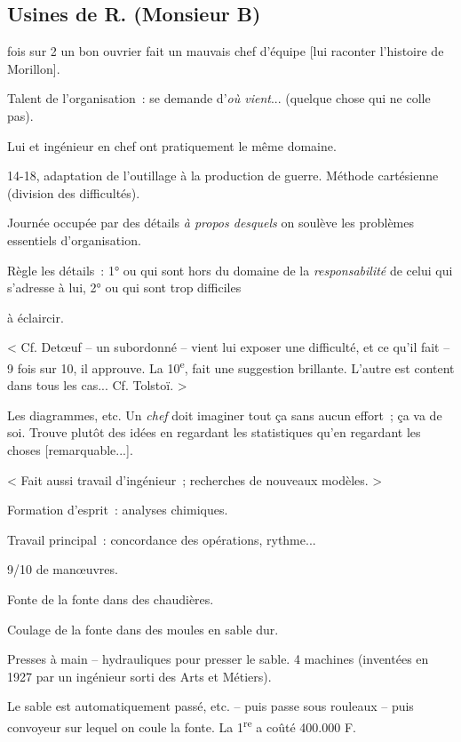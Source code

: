 \documentclass[french,twoside]{book} %
\begin{document}
\subsection[Usines de R. (Monsieur B)]{Usines de R. (Monsieur B)}
 fois sur 2 un bon ouvrier fait un mauvais chef d'équipe [lui raconter l'histoire de Morillon].\par
Talent de l'organisation : se demande d'{\itshape où vient}... (quelque chose qui ne colle pas).\par
Lui et ingénieur en chef ont pratiquement le même domaine.\par
14-18, adaptation de l'outillage à la production de guerre. Méthode cartésienne (division des difficultés).\par
Journée occupée par des détails {\itshape à propos desquels} on soulève les problèmes essentiels d'organisation.\par
Règle les détails : 1° ou qui sont hors du domaine de la {\itshape responsabilité} de celui qui s'adresse à lui, 2° ou qui sont trop difficiles\par
à éclaircir.\par
< Cf. Detœuf – un subordonné – vient lui exposer une difficulté, et ce qu'il fait – 9 fois sur 10, il approuve. La 10\textsuperscript{e}, fait une suggestion brillante. L'autre est content dans tous les cas... Cf. Tolstoï. >\par
Les diagrammes, etc. Un {\itshape chef} doit imaginer tout ça sans aucun effort ; ça va de soi. Trouve plutôt des idées en regardant les statistiques qu'en regardant les choses [remarquable...].\par
\par
< Fait aussi travail d'ingénieur ; recherches de nouveaux modèles. >\par
Formation d'esprit : analyses chimiques.\par
Travail principal : concordance des opérations, rythme...\par
9/10 de manœuvres.\par
Fonte de la fonte dans des chaudières.\par
Coulage de la fonte dans des moules en sable dur.\par
Presses à main – hydrauliques pour presser le sable. 4 machines (inventées en 1927 par un ingénieur sorti des Arts et Métiers).\par
Le sable est automatiquement passé, etc. – puis passe sous rouleaux – puis convoyeur sur lequel on coule la fonte. La 1\textsuperscript{re} a coûté 400.000 F.\par
\end{document}

